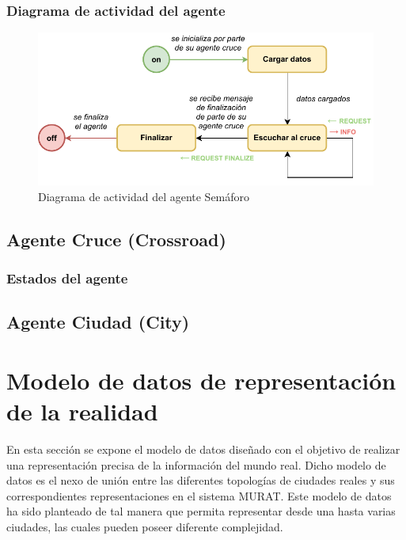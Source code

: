 \subsubsection{Diagrama de actividad del agente}
\begin{figure}[H]
    \centering
    \includegraphics[width=1\linewidth]{text/image/DAgen-DA-TrafficLight.pdf}
    \caption{Diagrama de actividad del agente Semáforo}
    \label{fig:da_agente_semaforo}
\end{figure}

\subsection{Agente Cruce (Crossroad)}
\subsubsection{Estados del agente}


\subsection{Agente Ciudad (City)}

\renewcommand{\labelitemi}{$\bullet$}
\renewcommand{\labelitemii}{$\circ$}
\renewcommand{\labelitemiii}{$\Rightarrow$}

\newpage
\section{Modelo de datos de representación de la realidad}
En esta sección se expone el modelo de datos diseñado con el objetivo de realizar una representación precisa de la información del mundo real. Dicho modelo de datos es el nexo de unión entre las diferentes topologías de ciudades reales y sus correspondientes representaciones en el sistema MURAT. Este modelo de datos ha sido planteado de tal manera que permita representar desde una hasta varias ciudades, las cuales pueden poseer diferente complejidad.

